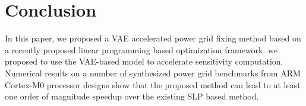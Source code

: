 \documentclass[journal]{IEEEtran}
\begin{document}








\section{Conclusion}
\label{sec:conclusion}
In this paper, we proposed a VAE accelerated power grid
fixing method based on a recently proposed linear programming based
optimization framework.  
we proposed to use the VAE-based model to accelerate sensitivity
computation.  Numerical results on a number of synthesized power grid
benchmarks from ARM Cortex-M0 processor designs show that the proposed
method can lead to at least one order of magnitude speedup over the
existing SLP based method. 






%
%
\end{document}
